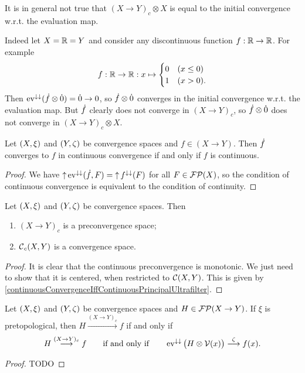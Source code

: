 \begin{example}
It is in general not true that $(X\to Y)_c\otimes X$ is equal to the initial convergence w.r.t. the evaluation map.

Indeed let $X=\mathbb{R}=Y$ and consider any discontinuous function $f:\mathbb{R}\to \mathbb{R}$. For example
\[ f: \mathbb{R}\to \mathbb{R}: x\mapsto \begin{cases}
0 & (x\leq 0) \\
1 & (x > 0).
\end{cases} \]
Then $\operatorname{ev}^{\downarrow\downarrow}(\dot{f}\otimes \dot{0}) = \dot{0} \to 0$, so $\dot{f}\otimes \dot{0}$ converges in the initial convergence w.r.t. the evaluation map. But $\dot{f}$ clearly does not converge in $(X\to Y)_c$, so $\dot{f}\otimes \dot{0}$ does not converge in $(X\to Y)_c\otimes X$.
\end{example}

\begin{lemma} \label{continuousConvergenceIffContinuousPrincipalUltrafilter}
Let $\left( X,\xi \right)$ and $\left( Y,\zeta \right)$ be convergence spaces and $f\in (X\to Y)$. Then $\dot{f}$ converges to $f$ in continuous convergence \textup{if and only if} $f$ is continuous.
\end{lemma}
\begin{proof}
We have $\operatorname{\uparrow}\operatorname{ev}^{\downarrow\downarrow}(\dot{f}, F) = \operatorname{\uparrow} f^{\downarrow\downarrow}(F)$ for all $F\in \operatorname{\mathcal{FP}}(X)$, so the condition of continuous convergence is equivalent to the condition of continuity.
\end{proof}

\begin{lemma}
Let $\left( X,\xi \right)$ and $\left( Y,\zeta \right)$ be convergence spaces. Then
\begin{enumerate}
\item $(X\to Y)_c$ is a preconvergence space;
\item $\operatorname{\mathcal{C}}_c(X,Y)$ is a convergence space.
\end{enumerate}
\end{lemma}
\begin{proof}
It is clear that the continuous preconvergence is monotonic. We just need to show that it is centered, when restricted to $\operatorname{\mathcal{C}}(X,Y)$. This is given by \ref{continuousConvergenceIffContinuousPrincipalUltrafilter}.
\end{proof}


\begin{lemma}
Let $\left( X,\xi \right)$ and $\left( Y,\zeta \right)$ be convergence spaces and $H\in \operatorname{\mathcal{FP}}(X\to Y)$. If $\xi$ is pretopological, then $H\overset{(X\to Y)_c}{\longrightarrow} f$ \textup{if and only if}
\[ H\overset{(X\to Y)_c}{\longrightarrow} f\qquad \text{if and only if} \qquad \operatorname{ev}^{\downarrow\downarrow}\big(H\otimes \operatorname{\mathcal{V}}(x)\big) \overset{\zeta}{\longrightarrow} f(x). \]
\end{lemma}
\begin{proof}
TODO
\end{proof}

